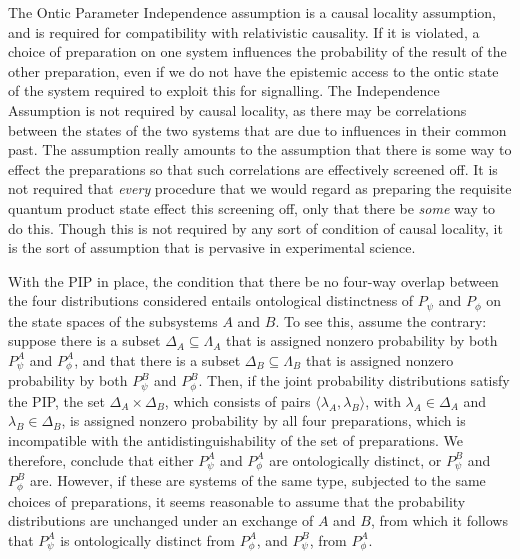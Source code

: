 \documentclass[12pt]{article}
\begin{document}
The Ontic Parameter Independence assumption is a causal locality assumption, and is required for compatibility with relativistic causality.  If it is violated, a choice of preparation on one system influences the probability of the result of the other preparation, even if we do not have the epistemic access to the ontic state of the system required to exploit this for signalling. The Independence Assumption is not required by causal locality, as there may be correlations between the states of the two systems that are due to influences in their common past.  The assumption really amounts to the assumption that there is some way to effect the preparations  so that such correlations are effectively screened off.  It is not required that \emph{every} procedure that we would regard as preparing the requisite quantum product state effect this screening off, only that there be \emph{some} way to do this.  Though this is not required by any sort of condition of causal locality, it is the sort of assumption that is pervasive in experimental science.


With the PIP in place, the condition that there be no four-way overlap between the four distributions considered entails ontological distinctness of $P_\psi$ and $P_\phi$   on the state spaces of the subsystems $A$ and $B$.  To see this, assume the contrary: suppose there is a subset $\Delta_A \subseteq \Lambda_A$ that is assigned nonzero probability by both $P_\psi^A$ and $P_\phi^A$, and that there is a subset $\Delta_B \subseteq \Lambda_B$ that is assigned nonzero probability by both $P_\psi^B$ and $P_\phi^B$.  Then, if the joint probability distributions satisfy the PIP, the set $\Delta_A \times \Delta _B$, which consists of pairs $\langle \lambda_A, \lambda_B \rangle$, with $\lambda_A \in \Delta_A$ and $\lambda_B \in \Delta_B$, is assigned nonzero probability by all four preparations, which is incompatible with the antidistinguishability of the set of preparations.  We therefore, conclude that either $P_\psi^A$ and $P_\phi^A$ are ontologically distinct, or $P_\psi^B$ and $P_\phi^B$ are.  However, if these are systems of the same type, subjected to the same choices of preparations, it seems reasonable to assume that the probability distributions are unchanged under an exchange of $A$ and $B$, from which it follows that  $P_\psi^A$ is ontologically distinct from $P_\phi^A$, and  $P_\psi^B$, from $P_\phi^A$.
\end{document}
